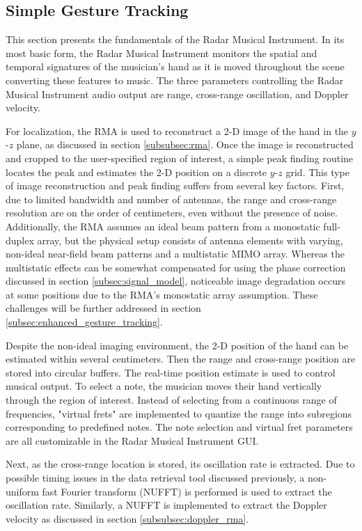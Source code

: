 \documentclass[10pt,journal,final]{IEEEtran}
\begin{document}
\subsection{Simple Gesture Tracking}
\label{subsec:classical_gesture_tracking}
This section presents the fundamentals of the Radar Musical Instrument. In its most basic form, the Radar Musical Instrument monitors the spatial and temporal signatures of the musician's hand as it is moved throughout the scene converting these features to music. The three parameters controlling the Radar Musical Instrument audio output are range, cross-range oscillation, and Doppler velocity.

For localization, the RMA is used to reconstruct a 2-D image of the hand in the $y$-$z$ plane, as discussed in section \ref{subsubsec:rma}. Once the image is reconstructed and cropped to the user-specified region of interest, a simple peak finding routine locates the peak and estimates the 2-D position on a discrete $y$-$z$ grid. This type of image reconstruction and peak finding suffers from several key factors. First, due to limited bandwidth and number of antennas, the range and cross-range resolution are on the order of centimeters, even without the presence of noise. Additionally, the RMA assumes an ideal beam pattern from a monostatic full-duplex array, but the physical setup consists of antenna elements with varying, non-ideal near-field beam patterns and a multistatic MIMO array. Whereas the multistatic effects can be somewhat compensated for using the phase correction discussed in section \ref{subsec:signal_model}, noticeable image degradation occurs at some positions due to the RMA's monostatic array assumption. These challenges will be further addressed in section \ref{subsec:enhanced_gesture_tracking}.

Despite the non-ideal imaging environment, the 2-D position of the hand can be estimated within several centimeters. Then the range and cross-range position are stored into circular buffers. The real-time position estimate is used to control musical output. To select a note, the musician moves their hand vertically through the region of interest. Instead of selecting from a continuous range of frequencies, "virtual frets" are implemented to quantize the range into subregions corresponding to predefined notes. The note selection and virtual fret parameters are all customizable in the Radar Musical Instrument GUI.

Next, as the cross-range location is stored, its oscillation rate is extracted. Due to possible timing issues in the data retrieval tool discussed previously, a non-uniform fast Fourier transform (NUFFT) is performed is used to extract the oscillation rate. Similarly, a NUFFT is implemented to extract the Doppler velocity as discussed in section \ref{subsubsec:doppler_rma}. 
\end{document}
